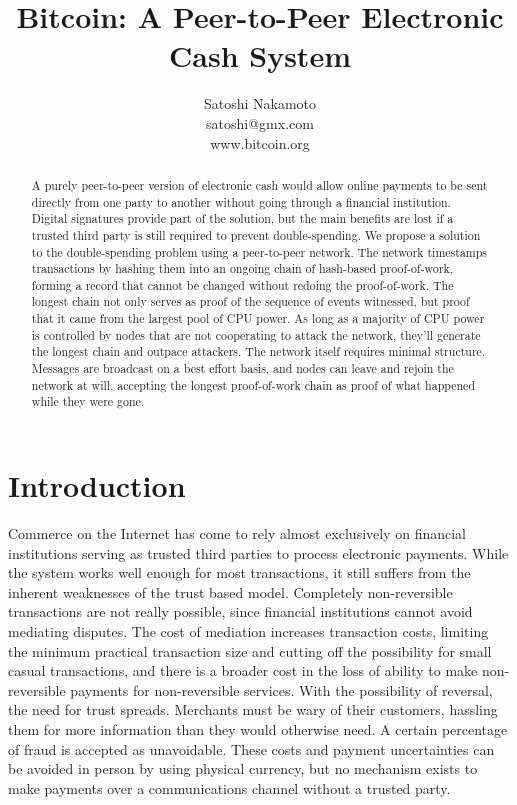 \documentclass{article}
\title{Bitcoin: A Peer-to-Peer Electronic Cash System}
\author{Satoshi Nakamoto \\ satoshi@gmx.com \\ www.bitcoin.org}
\date{} %
\begin{document}
\maketitle

\begin{abstract}
    A purely peer-to-peer version of electronic cash would allow online payments to be sent directly from one party to another without going through a financial institution.
    Digital signatures provide part of the solution, but the main benefits are lost if a trusted third party is still required to prevent double-spending.
    We propose a solution to the double-spending problem using a peer-to-peer network. The network timestamps transactions by hashing them into an ongoing chain of hash-based proof-of-work, forming a record that cannot be changed without redoing the proof-of-work.
    The longest chain not only serves as proof of the sequence of events witnessed, but proof that it came from the largest pool of CPU power.  As long as a majority of CPU power is controlled by nodes that are not cooperating to attack the network, they'll generate the longest chain and outpace attackers.
    The network itself requires minimal structure.
    Messages are broadcast on a best effort basis, and nodes can leave and rejoin the network at will, accepting the longest proof-of-work chain as proof of what happened while they were gone.
\end{abstract}

\section{Introduction}\label{sec:introduction}
Commerce on the Internet has come to rely almost exclusively on financial institutions serving as trusted third parties to process electronic payments.
While the system works well enough for most transactions, it still suffers from the inherent weaknesses of the trust based model.
Completely non-reversible transactions are not really possible, since financial institutions cannot avoid mediating disputes.
The cost of mediation increases transaction costs, limiting the minimum practical transaction size and cutting off the possibility for small casual transactions, and there is a broader cost in the loss of ability to make non-reversible payments for non-reversible services.
With the possibility of reversal, the need for trust spreads.
Merchants must be wary of their customers, hassling them for more information than they would otherwise need.
A certain percentage of fraud is accepted as unavoidable.
These costs and payment uncertainties can be avoided in person by using physical currency, but no mechanism exists to make payments over a communications channel without a trusted party.
\end{document}
